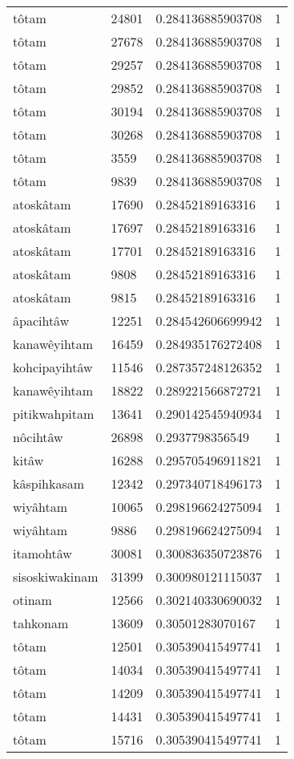 \begin{longtable}{llll}
tôtam & 24801 & 0.284136885903708 & 1 \\
tôtam & 27678 & 0.284136885903708 & 1 \\
tôtam & 29257 & 0.284136885903708 & 1 \\
tôtam & 29852 & 0.284136885903708 & 1 \\
tôtam & 30194 & 0.284136885903708 & 1 \\
tôtam & 30268 & 0.284136885903708 & 1 \\
tôtam & 3559 & 0.284136885903708 & 1 \\
tôtam & 9839 & 0.284136885903708 & 1 \\
atoskâtam & 17690 & 0.28452189163316 & 1 \\
atoskâtam & 17697 & 0.28452189163316 & 1 \\
atoskâtam & 17701 & 0.28452189163316 & 1 \\
atoskâtam & 9808 & 0.28452189163316 & 1 \\
atoskâtam & 9815 & 0.28452189163316 & 1 \\
âpacihtâw & 12251 & 0.284542606699942 & 1 \\
kanawêyihtam & 16459 & 0.284935176272408 & 1 \\
kohcipayihtâw & 11546 & 0.287357248126352 & 1 \\
kanawêyihtam & 18822 & 0.289221566872721 & 1 \\
pitikwahpitam & 13641 & 0.290142545940934 & 1 \\
nôcihtâw & 26898 & 0.2937798356549 & 1 \\
kitâw & 16288 & 0.295705496911821 & 1 \\
kâspihkasam & 12342 & 0.297340718496173 & 1 \\
wiyâhtam & 10065 & 0.298196624275094 & 1 \\
wiyâhtam & 9886 & 0.298196624275094 & 1 \\
itamohtâw & 30081 & 0.300836350723876 & 1 \\
sisoskiwakinam & 31399 & 0.300980121115037 & 1 \\
otinam & 12566 & 0.302140330690032 & 1 \\
tahkonam & 13609 & 0.30501283070167 & 1 \\
tôtam & 12501 & 0.305390415497741 & 1 \\
tôtam & 14034 & 0.305390415497741 & 1 \\
tôtam & 14209 & 0.305390415497741 & 1 \\
tôtam & 14431 & 0.305390415497741 & 1 \\
tôtam & 15716 & 0.305390415497741 & 1 \\

\end{longtable}
